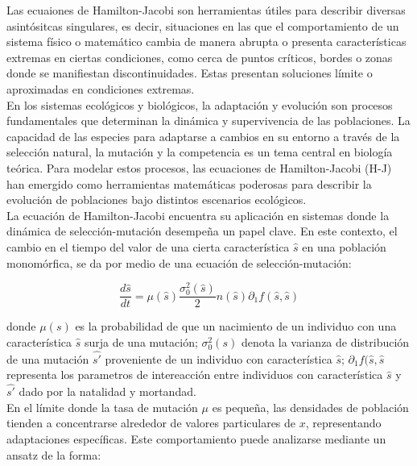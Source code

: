 \documentclass{article}
\begin{document}
{            \normalsize{\citep{Barles2006} Las ecuaiones de Hamilton-Jacobi son herramientas útiles para describir diversas asintósitcas singulares, es decir, situaciones en las que el comportamiento de un sistema físico o matemático cambia  de manera abrupta o presenta características extremas en ciertas condiciones, como cerca de puntos críticos, bordes o zonas donde se manifiestan discontinuidades. Estas presentan soluciones límite o aproximadas en condiciones extremas.
            }\\

            \normalsize{En los sistemas ecológicos y biológicos, la adaptación y evolución son procesos fundamentales que determinan la dinámica y supervivencia de las poblaciones. La capacidad de las especies para adaptarse a cambios en su entorno a través de la selección natural, la mutación y la competencia es un tema central en biología teórica. Para modelar estos procesos, las ecuaciones de Hamilton-Jacobi (H-J) han emergido como herramientas matemáticas poderosas para describir la evolución de poblaciones bajo distintos escenarios ecológicos.}\\

            \normalsize{\citep{Nicolas} La ecuación de Hamilton-Jacobi encuentra su aplicación en sistemas donde la dinámica de selección-mutación desempeña un papel clave. En este contexto, el cambio en el tiempo del valor de una cierta característica $\hat{s}$ en una población monomórfica, se da por medio de una ecuación de selección-mutación:}

            \begin{equation*}
                \frac{d \hat{s}}{d t}=\mu(\hat{s}) \frac{\sigma_0^2(\hat{s})}{2} n(\hat{s}) \partial_1 f(\hat{s}, \hat{s})
            \end{equation*}

            \normalsize{donde $\mu(s)$ es la probabilidad de que un nacimiento de un individuo con una característica $\hat{s}$ surja de una mutación; $\sigma_0^2(s)$ denota la varianza de distribución de una mutación $\hat{s'}$ proveniente de un individuo con característica $\hat{s}$; $\partial_1 f(\hat{s}, \hat{s}$ representa los parametros de intereacción entre individuos con característica $\hat{s}$ y $\hat{s'}$ dado por la natalidad y mortandad.}\\

            \normalsize{\citep{Calves} En el límite donde la tasa de mutación \( \mu \) es pequeña, las densidades de población tienden a concentrarse alrededor de valores particulares de \( x \), representando adaptaciones específicas. Este comportamiento puede analizarse mediante un ansatz de la forma:}

}
\end{document}
